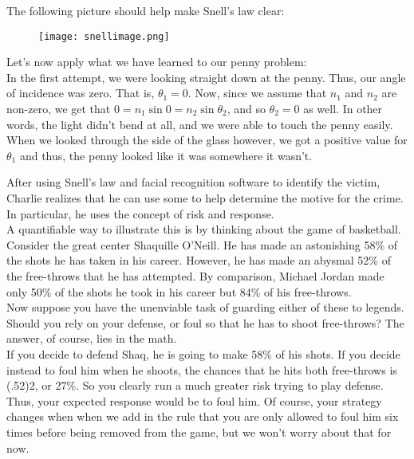 The following picture should help make Snell's law clear:

\begin{figure}[H]
   \centering
   \texttt{[image: snellimage.png]} 
\end{figure}

Let's now apply what we have learned to our penny problem: \\

In the first attempt, we were looking straight down at the penny. Thus, our angle of incidence was zero. That is, $\theta_1=0$. Now, since we assume that $n_1$ and $n_2$ are non-zero, we get that $0= n_1\sin 0=n_2\sin\theta_2$, and so $\theta_2=0$ as well. In other words, the light didn't bend at all, and we were able to touch the penny easily. \\

When we looked through the side of the glass however, we got a positive value for $\theta_1$ and thus, the penny looked like it was somewhere it wasn't. \\


After using Snell's law and facial recognition software to identify the victim, Charlie realizes that he can use some  to help determine the motive for the crime. In particular, he uses the concept of risk and response. \\

A quantifiable way to illustrate this is by thinking about the game of basketball. Consider the great center Shaquille O'Neill. He has made an astonishing 58\% of the shots he has taken in his career. However, he has made an abysmal 52\% of the free-throws that he has attempted. By comparison, Michael Jordan made only 50\% of the shots he took in his career but 84\% of his free-throws. \\

Now suppose you have the unenviable task of guarding either of these to legends. Should you rely on your defense, or foul so that he has to shoot free-throws? The answer, of course, lies in the math. \\ 

If you decide to defend Shaq, he is going to make 58\% of his shots. If you decide instead to foul him when he shoots, the chances that he hits both free-throws is (.52)2, or 27\%. So you clearly run a much greater risk trying to play defense. Thus, your expected response would be to foul him. Of course, your strategy changes when when we add in the rule that you are only allowed to foul him six times before being removed from the game, but we won't worry about that for now. \\

